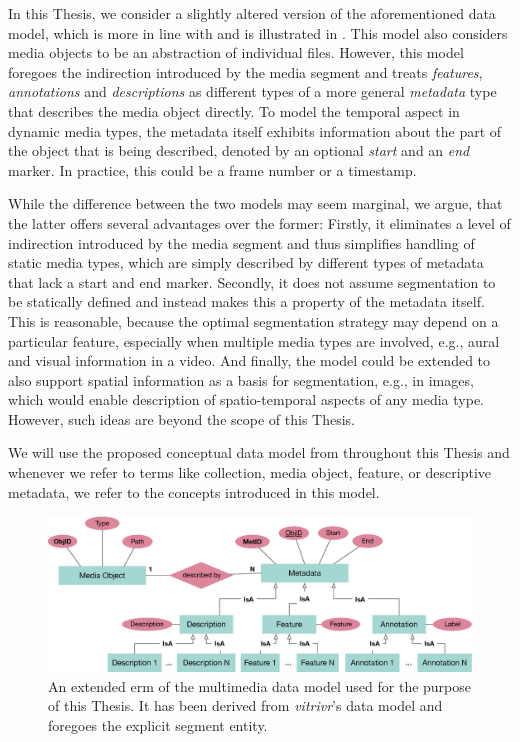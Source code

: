In this Thesis, we consider a slightly altered version of the aforementioned data model, which is more in line with \cite{Blanken:2007multimedia} and is illustrated in . This model also considers media objects to be an abstraction of individual files. However, this model foregoes the indirection introduced by the media segment and treats \emph{features}, \emph{annotations} and \emph{descriptions} as different types of a more general \emph{metadata} type that describes the media object directly. To model the temporal aspect in dynamic media types, the metadata itself exhibits information about the part of the object that is being described, denoted by an optional \emph{start} and an \emph{end} marker. In practice, this could be a frame number or a timestamp.

While the difference between the two models may seem marginal, we argue, that the latter offers several advantages over the former: Firstly, it eliminates a level of indirection introduced by the media segment and thus simplifies handling of static media types, which are simply described by different types of metadata that lack a start and end marker. Secondly, it does not assume segmentation to be statically defined and instead makes this a property of the metadata itself. This is reasonable, because the optimal segmentation strategy may depend on a particular feature, especially when multiple media types are involved, e.g., aural and visual information in a video. And finally, the model could be extended to also support spatial information as a basis for segmentation, e.g., in images, which would enable description of spatio-temporal aspects of any media type. However, such ideas are beyond the scope of this Thesis. 

We will use the proposed conceptual data model from  throughout this Thesis and whenever we refer to terms like collection, media object, feature, or descriptive metadata, we refer to the concepts introduced in this model.

\begin{figure}[bt]
    \centering
    \includegraphics[width=\textwidth]{figures/erm-media-data}
    \caption{An extended \acrshort{erm} of the multimedia data model used for the purpose of this Thesis. It has been derived from \emph{vitrivr}'s data model and foregoes the explicit segment entity.}
    \label{figure:erm_mediadata}
\end{figure}

